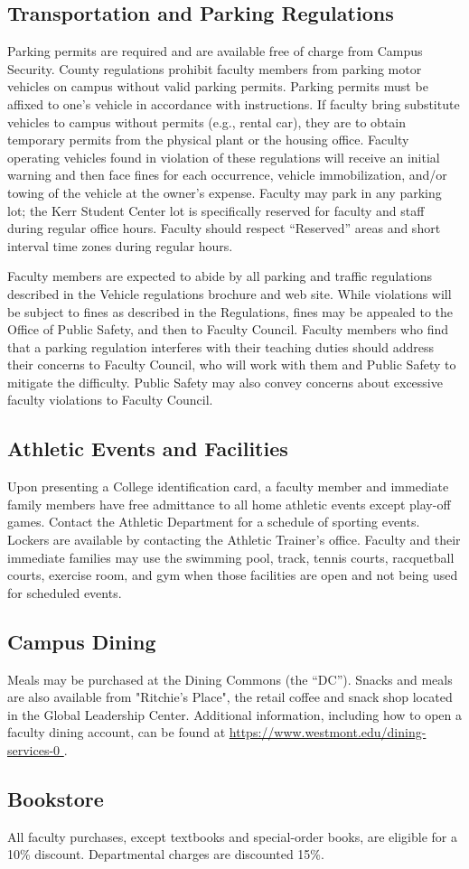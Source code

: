 	\subsection{Transportation and Parking Regulations}

		Parking permits are required and are available free of charge from Campus Security.  County regulations prohibit faculty members from parking motor vehicles on campus without valid parking permits.  Parking permits must be affixed to one's vehicle in accordance with instructions.  If faculty bring substitute vehicles to campus without permits (e.g., rental car), they are to obtain temporary permits from the physical plant or the housing office.  Faculty operating vehicles found in violation of these regulations will receive an initial warning and then face fines for each occurrence, vehicle immobilization, and/or towing of the vehicle at the owner's expense.  Faculty may park in any parking lot; the Kerr Student Center lot is specifically reserved for faculty and staff during regular office hours.  Faculty should respect ``Reserved'' areas and short interval time zones during regular hours.

		Faculty members are expected to abide by all parking and traffic regulations described in the Vehicle regulations brochure and web site.  While violations will be subject to fines as described in the Regulations, fines may be appealed to the Office of Public Safety, and then to Faculty Council.  Faculty members who find that a parking regulation interferes with their teaching duties should address their concerns to Faculty Council, who will work with them and Public Safety to mitigate the difficulty.  Public Safety may also convey concerns about excessive faculty violations to Faculty Council.
	\subsection{Athletic Events and Facilities}
		Upon presenting a College identification card, a faculty member and immediate family members have free admittance to all home athletic events except play-off games.  Contact the Athletic Department for a schedule of sporting events.  Lockers are available by contacting the Athletic Trainer's office.  Faculty and their immediate families may use the swimming pool, track, tennis courts, racquetball courts, exercise room, and gym when those facilities are open and not being used for scheduled events.
	\subsection{Campus Dining}
		Meals may be purchased at the Dining Commons (the ``DC'').  Snacks and meals are also available from "Ritchie's Place", the retail coffee and snack shop located in the Global Leadership Center.  Additional information, including how to open a faculty dining account, can be found at
		\href{https://www.westmont.edu/dining-services-0}{\url{https://www.westmont.edu/dining-services-0 }}.
	\subsection{Bookstore}
		All faculty purchases, except textbooks and special-order books, are eligible
		for a 10\% discount.  Departmental charges are discounted 15\%.
